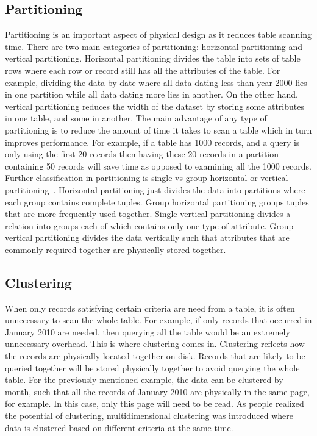 \documentclass[12pt,a4paper]{article}
\begin{document}
\subsection{Partitioning}

Partitioning is an important aspect of physical design as it reduces table scanning time. There are two main categories of partitioning: horizontal partitioning
and vertical partitioning. Horizontal partitioning divides the table into sets of table rows where each row or record still has all the attributes of the table.
For example, dividing the data by date where all data dating less than year 2000 lies in one partition while all data dating more lies in another. On the other
hand, vertical partitioning reduces the width of the dataset by storing some attributes in one table, and some in another.
The main advantage of any type of partitioning is to reduce the amount of time it takes to scan a table which in turn improves performance. For example, if a
table has 1000 records, and a query is only using the first 20 records then having these 20 records in a partition containing 50 records will save time as
opposed to examining all the 1000 records. Further classification in partitioning is single vs group horizontal or vertical
partitioning~\cite{gruenwald1990database}. Horizontal partitioning just divides the data into partitions where each group contains complete tuples. Group
horizontal partitioning groups tuples that are more frequently used together. Single vertical partitioning divides a relation into groups each of which contains
only one type of attribute. Group vertical partitioning divides the data vertically such that attributes that are commonly required together are physically
stored together.


\subsection{Clustering}
When only records satisfying certain criteria are need from a table, it is often unnecessary to scan the whole table. For example, if only records that occurred
in January 2010 are needed, then querying all the table would be an extremely unnecessary overhead. This is where clustering comes in. Clustering reflects how
the records are physically located together on disk. Records that are likely to be queried together will be stored physically together to avoid querying the
whole table. For the previously mentioned example, the data can be clustered by month, such that all the records of January 2010 are physically in the same
page, for example. In this case, only this page will need to be read. As
people realized the potential of clustering, multidimensional clustering was introduced where data is clustered based on different criteria at the same time.
\end{document}
